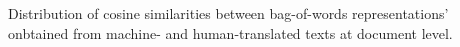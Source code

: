 Distribution of cosine similarities between bag-of-words representations' onbtained from machine- and human-translated texts at document level. \label{fig:input_similarity}
